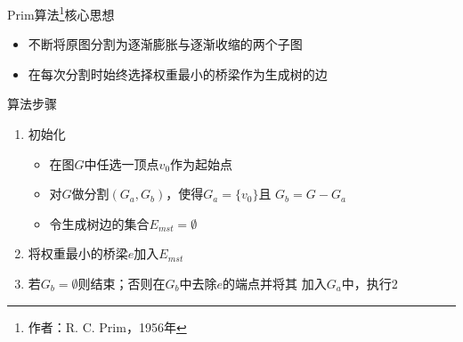 \begin{fragile}
    \frametitle{\insertsectionhead}
    \begin{block}{Prim算法\footnote{作者：R. C. Prim，1956年}核心思想}
        \begin{itemize}
            \item 不断将原图分割为逐渐\alert{膨胀}与逐渐\alert{收缩}的两个子图
            \item 在每次分割时始终选择权重\alert{最小}的桥梁作为生成树的边
        \end{itemize}
    \end{block}
    \begin{exampleblock}{算法步骤}
        \begin{enumerate}
            \item 初始化
                  \begin{itemize}
                      \item 在图$G$中任选一顶点$v_{0}$作为起始点
                      \item 对$G$做分割$(G_{a},G_{b})$，使得$G_{a}=\{v_{0}\}$且
                            $G_{b}=G-G_{a}$
                      \item 令生成树边的集合$E_{mst}=\emptyset$
                  \end{itemize}
            \item 将权重最小的桥梁$e$加入$E_{mst}$
            \item 若$G_{b}=\emptyset$则结束；否则在$G_{b}$中去除$e$的端点并将其
                  加入$G_{a}$中，执行2
        \end{enumerate}
    \end{exampleblock}
\end{fragile}

